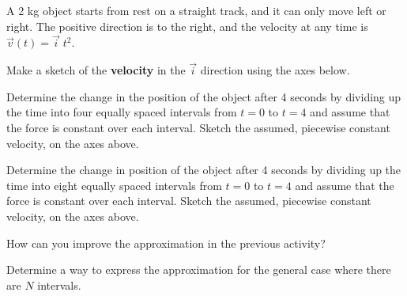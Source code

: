 \begin{problem}
\item A 2 kg object starts from rest on a straight track, and it can
  only move left or right. The positive direction is to the right, and
  the velocity at any time is $\vec{v}(t)=\vec{i} \; t^2$.

  \begin{subproblem}
    \item Make a sketch of the \textbf{velocity} in the $\vec{i}$
      direction using the axes below.



    \item Determine the change in the position of the object after 4
      seconds by dividing up the time into four equally spaced
      intervals from $t=0$ to $t=4$ and assume that the force is constant over each
      interval. Sketch the assumed, piecewise constant velocity, on the
      axes above.
      \vfill
    \item Determine the change in position of the object after 4
      seconds by dividing up the time into eight equally spaced
      intervals from $t=0$ to $t=4$ and assume that the force is constant over each
      interval. Sketch the assumed, piecewise constant velocity, on the
      axes above.
      \vfill
  \end{subproblem}
  \clearpage

\item How can you improve the approximation in the previous activity?
  \vspace{3em}

\item Determine a way to express the approximation for the general
  case where there are $N$ intervals.

  \vfill

\end{problem}

